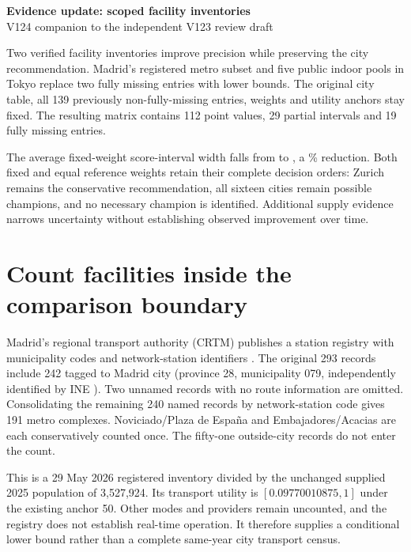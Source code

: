 \documentclass[12pt]{article}
\begin{document}
\begin{center}{\Large\bfseries Evidence update: scoped facility inventories}\\[6pt]
V124 companion to the independent V123 review draft
\end{center}
Two verified facility inventories improve precision while preserving the city
recommendation. Madrid's registered metro subset and five public indoor pools
in Tokyo replace two fully missing entries with lower bounds. The original
city table, all 139 previously non-fully-missing entries, weights and utility
anchors stay fixed. The resulting matrix contains 112 point values, 29 partial
intervals and 19 fully missing entries.



The average fixed-weight score-interval width falls from \WidthBefore{} to
\WidthAfter{}, a \WidthReduction\% reduction. Both fixed and equal reference
weights retain their complete decision orders: Zurich remains the conservative
recommendation, all sixteen cities remain possible champions, and no necessary
champion is identified. Additional supply evidence narrows uncertainty without
establishing observed improvement over time.

\section*{Count facilities inside the comparison boundary}
Madrid's regional transport authority (CRTM) publishes a station registry with
municipality codes and network-station identifiers \cite{crtm}. The original
293 records include 242 tagged to Madrid city (province 28, municipality 079,
independently identified by INE \cite{ine}). Two unnamed records with no route
information are omitted. Consolidating the remaining 240 named records by
network-station code gives 191 metro complexes. Noviciado/Plaza de Espa\~na and
Embajadores/Acacias are each conservatively counted once. The fifty-one
outside-city records do not enter the count.

This is a 29 May 2026 registered inventory divided by the unchanged supplied
2025 population of 3,527,924. Its transport utility is
$[0.09770010875,1]$ under the existing anchor 50. Other modes and providers
remain uncounted, and the registry does not establish real-time operation.
It therefore supplies a conditional lower bound rather than a complete
same-year city transport census.
\end{document}
